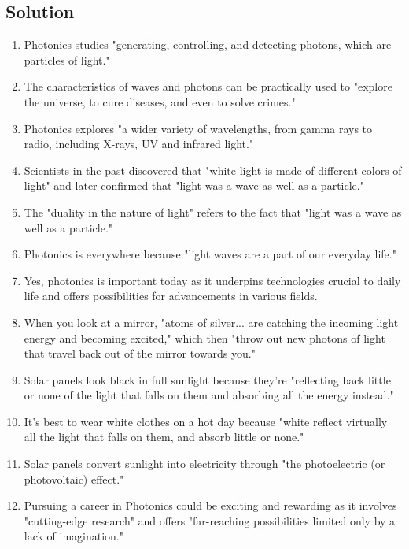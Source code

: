\subsection*{Solution}
\begin{enumerate}
      \item Photonics studies "generating, controlling, and detecting photons, which
            are particles of light."
      \item The characteristics of waves and photons can be practically used to
            "explore the universe, to cure diseases, and even to solve crimes."
      \item Photonics explores "a wider variety of wavelengths, from gamma rays to
            radio, including X-rays, UV and infrared light."
      \item Scientists in the past discovered that "white light is made of different
            colors of light" and later confirmed that "light was a wave as well
            as a particle."
      \item The "duality in the nature of light" refers to the fact that "light was
            a wave as well as a particle."
      \item Photonics is everywhere because "light waves are a part of our everyday
            life."
      \item Yes, photonics is important today as it underpins technologies crucial
            to daily life and offers possibilities for advancements in various fields.
      \item When you look at a mirror, "atoms of silver... are catching the incoming
            light energy and becoming excited," which then "throw out new photons of
            light that travel back out of the mirror towards you."
      \item Solar panels look black in full sunlight because they're "reflecting back
            little or none of the light that falls on them and absorbing all the energy
            instead."
      \item It's best to wear white clothes on a hot day because "white reflect
            virtually all the light that falls on them, and absorb little or none."
      \item Solar panels convert sunlight into electricity through "the photoelectric
            (or photovoltaic) effect."
      \item Pursuing a career in Photonics could be exciting and rewarding as it
            involves "cutting-edge research" and offers "far-reaching possibilities
            limited only by a lack of imagination."
\end{enumerate}

